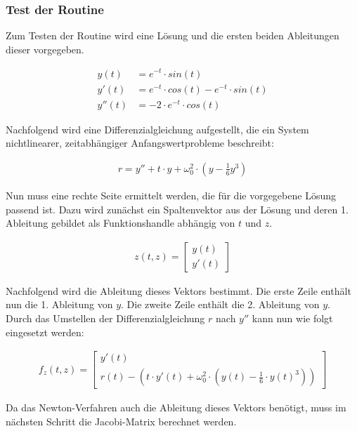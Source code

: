 \documentclass[
	pagesize,
	fontsize=12pt,
	paper=a4,
	oneside,
   reqno
]{scrartcl}
\begin{document}
\subsubsection{Test der Routine}

Zum Testen der Routine wird eine Lösung und die ersten beiden Ableitungen dieser vorgegeben.

\begin{align*}
   y(t) &= e^{-t} \cdot sin(t) \\
   y'(t) &= e^{-t} \cdot cos(t) - e^{-t} \cdot sin(t) \\
   y''(t) &= -2 \cdot e^{-t} \cdot cos(t)
\end{align*}

Nachfolgend wird eine Differenzialgleichung aufgestellt, die ein System nichtlinearer, zeitabhängiger Anfangswertprobleme beschreibt:

\begin{align*}
   r = y'' + t \cdot y + \omega _0^2 \cdot (y - \frac{1}{6} y^3)
\end{align*}

Nun muss eine rechte Seite ermittelt werden, die für die vorgegebene Lösung passend ist. Dazu wird zunächst ein Spaltenvektor aus der Lösung und deren 1. Ableitung gebildet als Funktionshandle abhängig von $t$ und $z$.

\begin{align*}
   z(t,z) =
   \begin{bmatrix*}
      y(t) \\
      y'(t)
   \end{bmatrix*}
\end{align*}

Nachfolgend wird die Ableitung dieses Vektors bestimmt. Die erste Zeile enthält nun die 1. Ableitung von $y$. Die zweite Zeile enthält die 2. Ableitung von $y$. Durch das Umstellen der Differenzialgleichung $r$ nach $y''$ kann nun wie folgt eingesetzt werden:

\begin{align*}
   f_z(t,z) =
   \begin{bmatrix*}
      y'(t) \\
      r(t) - \left( t \cdot y'(t) + \omega _0^2 \cdot \left( y(t) - \frac{1}{6} \cdot y(t)^3\right) \right)
   \end{bmatrix*}
\end{align*}

Da das Newton-Verfahren auch die Ableitung dieses Vektors benötigt, muss im nächsten Schritt die Jacobi-Matrix berechnet werden.
\end{document}

